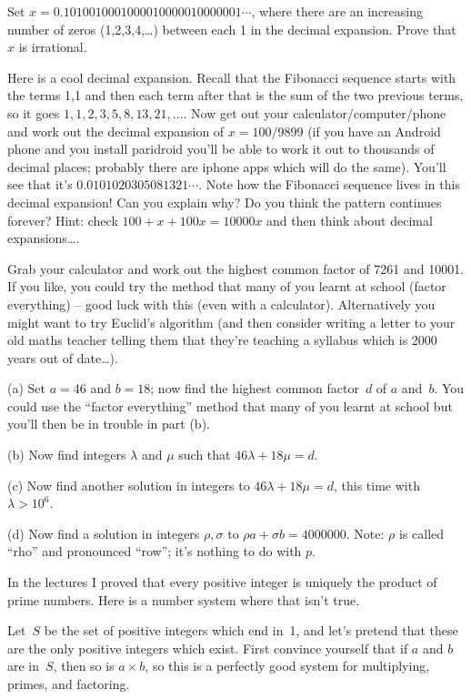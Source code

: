 \documentclass[10pt]{article}
\begin{document}
\medskip{} Set $x=0.1010010001000010000010000001\cdots$, where there are an increasing number of zeros (1,2,3,4,\ldots) between each 1 in the decimal expansion. Prove that~$x$ is irrational.

\medskip{} Here is a cool decimal expansion. Recall that the Fibonacci sequence starts with the terms 1,1 and then each term after that is the sum of the two previous terms, so it goes $1,1,2,3,5,8,13,21,\ldots$. Now get out your calculator/computer/phone and work out the decimal expansion of $x=100/9899$ (if you have an Android phone and you install paridroid you'll be able to work it out to thousands of decimal places; probably there are iphone apps which will do the same). You'll see that it's $0.0101020305081321\cdots$. Note how the Fibonacci sequence lives in this decimal expansion! Can you explain why? Do you think the pattern continues forever? Hint: check $100+x+100x=10000x$ and then think about decimal expansions\ldots.

\medskip{} Grab your calculator and work out the highest common factor of 7261 and 10001. If you like, you could try the method that many of you learnt at school (factor everything) -- good luck with this (even with a calculator). Alternatively you might want to try Euclid's algorithm (and then consider writing a letter to your old maths teacher telling them that they're teaching a syllabus which is 2000 years out of date\ldots).

\medskip{} 

(a) Set $a=46$ and $b=18$; now find the highest common factor~$d$ of $a$ and~$b$. You could use the ``factor everything'' method that many of you learnt at school but you'll then be in trouble in part (b).

(b) Now find integers $\lambda$ and $\mu$ such that $46\lambda+18\mu=d$.

(c) Now find another solution in integers to $46\lambda+18\mu=d$, this time with $\lambda>10^6$.

(d) Now find a solution in integers $\rho,\sigma$ to $\rho a+\sigma b=4000000$.
Note: $\rho$ is called ``rho'' and pronounced ``row''; it's nothing to do with $p$.

\medskip{} In the lectures I proved that every positive integer is uniquely the product of prime numbers. Here is a number system where that isn't true.

Let~$S$ be the set of positive integers which end in~1, and let's pretend that these are the only positive integers which exist. First convince yourself that if $a$ and $b$ are in~$S$, then so is $a\times b$, so this is a perfectly good system for multiplying, primes, and factoring.
\end{document}
